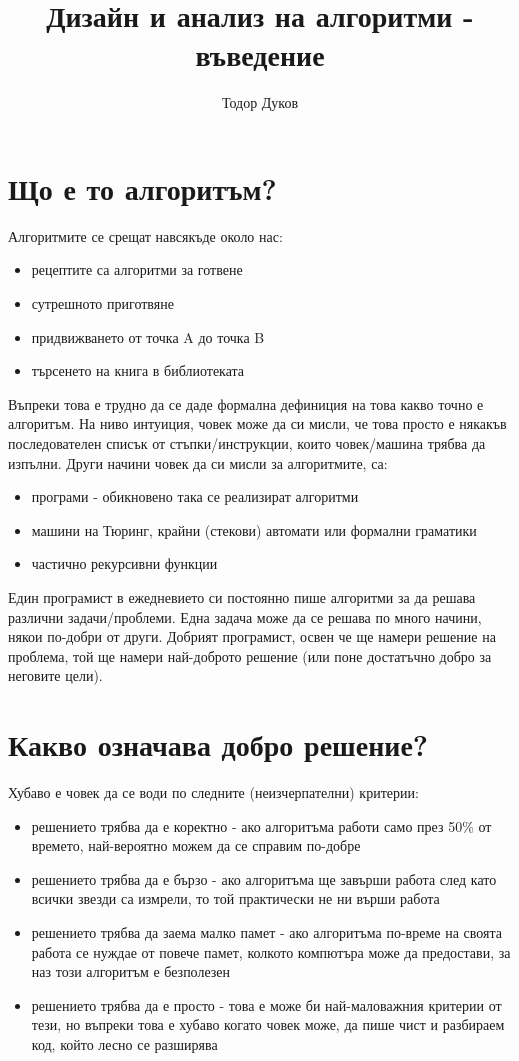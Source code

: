 \documentclass{article}
\title{Дизайн и анализ на алгоритми - въведение}
\author{Тодор Дуков}
\date{}
\theoremstyle{definition}
\theoremstyle{plain}
\theoremstyle{remark}
\theoremstyle{definition}
\begin{document}
\maketitle

\section*{Що е то алгоритъм?}

Алгоритмите се срещат навсякъде около нас:
\begin{itemize}
  \item рецептите са алгоритми за готвене
  \item сутрешното приготвяне
  \item придвижването от точка A до точка B
  \item търсенето на книга в библиотеката
\end{itemize}

Въпреки това е трудно да се даде формална дефиниция на това какво точно е алгоритъм.
На ниво интуиция, човек може да си мисли, че това просто е някакъв последователен списък от стъпки/инструкции, които човек/машина трябва да изпълни.
Други начини човек да си мисли за алгоритмите, са:
\begin{itemize}
  \item програми - обикновено така се реализират алгоритми
  \item машини на Тюринг, крайни (стекови) автомати или формални граматики
  \item частично рекурсивни функции
\end{itemize}

Един програмист в ежедневието си постоянно пише алгоритми за да решава различни задачи/проблеми.
Една задача може да се решава по много начини, някои по-добри от други.
Добрият програмист, освен че ще намери решение на проблема, той ще намери най-доброто решение (или поне достатъчно добро за неговите цели).

\section*{Какво означава добро решение?}

Хубаво е човек да се води по следните (неизчерпателни) критерии:
\begin{itemize}
  \item решението трябва да е коректно - ако алгоритъма работи само през 50\% от времето, най-вероятно можем да се справим по-добре
  \item решението трябва да е бързо - ако алгоритъма ще завърши работа след като всички звезди са измрели, то той практически не ни върши работа
  \item решението трябва да заема малко памет - ако алгоритъма по-време на своята работа се нуждае от повече памет, колкото компютъра може да предостави, за наз този алгоритъм е безполезен
  \item решението трябва да е просто - това е може би най-маловажния критерии от тези, но въпреки това е хубаво когато човек може, да пише чист и разбираем код, който лесно се разширява
\end{itemize}
\end{document}
